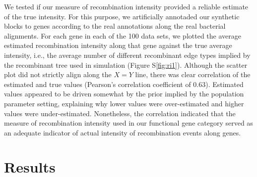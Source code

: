 \documentclass[english]{article}
\begin{document}
We tested if our measure of recombination intensity provided a reliable 
estimate of the true intensity. For this purpose, we artificially annotaded our 
synthetic blocks to genes according to the real annotations along the real 
bacterial alignments. For each gene in each of the 100 data sets, we plotted 
the average estimated recombination intensity along that gene against the true 
average intensity, i.e., the average number of different recombinant edge types 
implied by the recombinant tree used in simulation (Figure S\ref{fig:ri1}). 
Although the scatter plot did not strictly align along the $X=Y$ line, there 
was clear correlation of the estimated and true values (Pearson's correlation 
coefficient of 0.63). Estimated values appeared to be driven somewhat by the 
prior implied by the population parameter setting, explaining why lower values 
were over-estimated and higher values were under-estimated. Nonetheless, the 
correlation indicated that the measure of recombination intensity used in our 
functional gene category served as an adequate indicator of actual intensity of 
recombination events along genes.

\clearpage{}

\section{Results}
\end{document}
